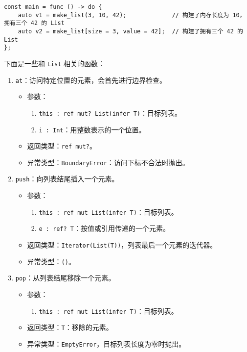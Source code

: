 \begin{lstlisting}
const main = func () -> do {
	auto v1 = make_list(3, 10, 42);				// 构建了内存长度为 10，拥有三个 42 的 List
	auto v2 = make_list[size = 3, value = 42];	// 构建了拥有三个 42 的 List
};
\end{lstlisting}

下面是一些和 \lstinline!List! 相关的函数：

\begin{enumerate}
	\item \lstinline!at!：访问特定位置的元素，会首先进行边界检查。
	\begin{itemize}
		\item 参数：
		\begin{enumerate}
			\item \lstinline!this : ref mut? List(infer T)!：目标列表。
			\item \lstinline!i : Int!：用整数表示的一个位置。
		\end{enumerate}
		\item 返回类型：\lstinline!ref mut?!。
		\item 异常类型：\lstinline!BoundaryError!：访问下标不合法时抛出。
	\end{itemize}
	
	\item \lstinline!push!：向列表结尾插入一个元素。
	\begin{itemize}
		\item 参数：
		\begin{enumerate}
			\item \lstinline!this : ref mut List(infer T)!：目标列表。
			\item \lstinline!e : ref? T!：按值或引用传递的一个元素。
		\end{enumerate}
		\item 返回类型：\lstinline!Iterator(List(T))!，列表最后一个元素的迭代器。
		\item 异常类型：\lstinline!()!。
	\end{itemize}
	
	\item \lstinline!pop!：从列表结尾移除一个元素。
	\begin{itemize}
		\item 参数：
		\begin{enumerate}
			\item \lstinline!this : ref mut List(infer T)!：目标列表。
		\end{enumerate}
		\item 返回类型：\lstinline!T!：移除的元素。
		\item 异常类型：\lstinline!EmptyError!，目标列表长度为零时抛出。
	\end{itemize}
	

\end{enumerate}
